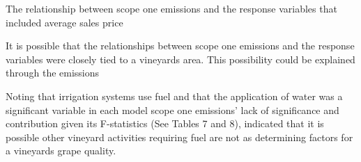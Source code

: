 \documentclass[12pt,australian]{article}
\begin{document}
\begin{sloppypar}






The relationship between scope one emissions and the response variables that included average sales price

It is possible that the relationships between scope one emissions and the response variables were closely tied to a vineyards area. This possibility could be explained through the emissions 

Noting that irrigation systems use fuel
and that the application of water was a significant variable in each model
scope one emissions' lack of significance and contribution given its F-statistics (See Tables 7 and 8),
 indicated that it is possible other vineyard activities requiring fuel are not as determining factors for a vineyards grape quality.


\printbibliography{}
\end{sloppypar}
\end{document}
